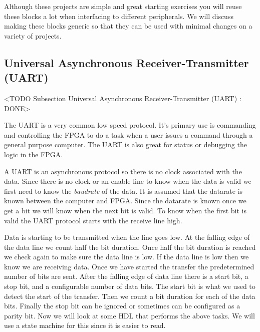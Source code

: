 Although these projects are simple and great starting exercises you will reuse these blocks a lot when interfacing to different peripherals. We will discuss making these blocks generic so that they can be used with minimal changes on a variety of projects.

\subsection{Universal Asynchronous Receiver-Transmitter (UART)}
	<TODO Subsection Universal Asynchronous Receiver-Transmitter (UART) : DONE>
	
The \ac{UART} is a very common low speed protocol. It's primary use is commanding and controlling the FPGA to do a task when a user issues a command through a general purpose computer. The \ac{UART} is also great for status or debugging the logic in the \ac{FPGA}.

A \ac{UART} is an asynchronous protocol so there is no clock associated with the data. Since there is no clock or an enable line to know when the data is valid we first need to know the \emph{baudrate} of the data. It is assumed that the datarate is known between the computer and \ac{FPGA}. Since the datarate is known once we get a bit we will know when the next bit is valid. To know when the first bit is valid the \ac{UART} protocol starts with the receive line high. 

Data is starting to be transmitted when the line goes low. At the falling edge of the data line we count half the bit duration. Once half the bit duration is reached we check again to make sure the data line is low. If the data line is low then we know we are receiving data. Once we have started the transfer the predetermined number of bits are sent. After the falling edge of data line there is a start bit, a stop bit, and a configurable number of data bits. The start bit is what we used to detect the start of the transfer. Then we count a bit duration for each of the data bits. Finally the stop bit can be ignored or sometimes can be configured as a parity bit.  Now we will look at some \ac{HDL} that performs the above tasks. We will use a state machine for this since it is easier to read. 
	
